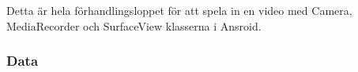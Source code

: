 Detta är hela förhandlingsloppet för att spela in en video med Camera, MediaRecorder och SurfaceView klasserna i Ansroid.

\subsubsection{Data}

